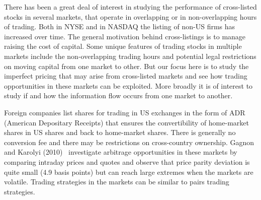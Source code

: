 There has been a great deal of interest in studying the performance of cross-listed stocks in several markets, that operate in overlapping or in non-overlapping hours of trading. Both in NYSE and in NASDAQ the listing of non-US firms has increased over time. The general motivation behind cross-listings is to manage raising the cost of capital. Some unique features of trading stocks in multiple markets include the non-overlapping trading hours and potential legal restrictions on moving capital from one market to other. But our focus here is to study the imperfect pricing that may arise from cross-listed markets and see how trading opportunities in these markets can be exploited. More broadly it is of interest to study if and how the information flow occurs from one market to another.


Foreign companies list shares for trading in US exchanges in the form of ADR (American Depositary Receipts) that ensures the convertibility of home-market shares in US shares and back to home-market shares. There is generally no conversion fee and there may be restrictions on cross-country ownership. Gagnon and Karolyi (2010)~\cite{gagkar} investigate arbitrage opportunities in these markets by comparing intraday prices and quotes and observe that price parity deviation is quite small (4.9 basis points) but can reach large extremes when the markets are volatile. Trading strategies in the markets can be similar to pairs trading strategies. 


